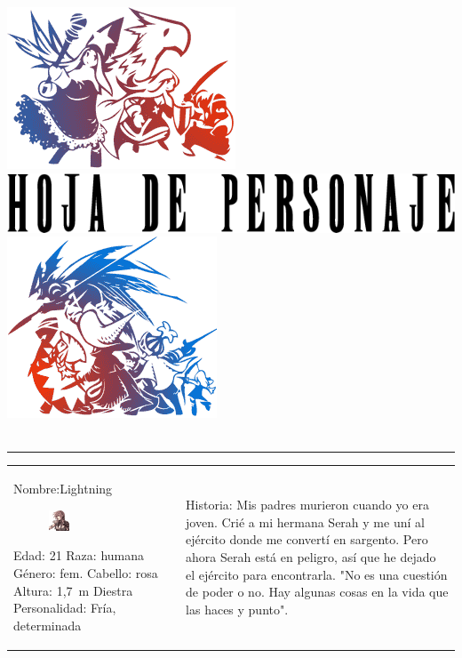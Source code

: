 \clearpage
\thispagestyle{empty}
{
	\noindent \includegraphics[width=0.18\columnwidth]{./art/images/tleft.png} 
	\hspace{0.8cm}
	\includegraphics[width=0.55\columnwidth]{./art/images/cs.png}
	\hfill
	\includegraphics[width=0.15\columnwidth]{./art/images/tright.png} \\\
}
\vspace{-0.5cm}
\hrule
\begin{tabularx}{\columnwidth}{XX@{\hspace{0.3cm}}}
	\noindent \newline
 \hypertarget{csex}{Nombre}:\hspace{0.5cm}Lightning 
	\begin{figure} 
	\includegraphics[width=0.23\textwidth]{./art/images/claire.png}
	\end{figure} \newline 
 Edad: 21 \newline
 Raza: humana \newline
 Género: fem. \newline
 Cabello: rosa \newline
 Altura: 1,7 m \newline
 Diestra \newline \newline \newline
 Personalidad: Fría, determinada \newline  
	&  
	\noindent \newline
 Historia:
	\newline  \newline 
 Mis padres murieron cuando yo era joven. Crié a mi hermana Serah y me uní al ejército donde me convertí en sargento. Pero ahora Serah está en peligro, así que he dejado el ejército para encontrarla. 
\newline\newline
 "No es una cuestión de poder o no. Hay algunas cosas en la vida que las haces y punto".
\end{tabularx}
